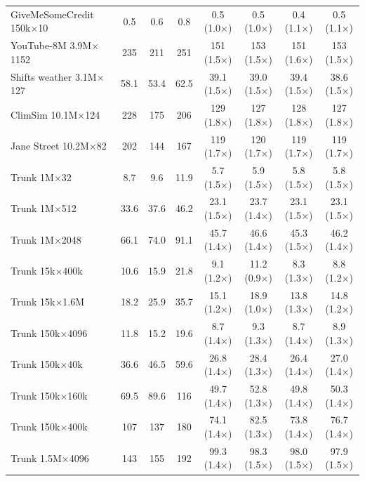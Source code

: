 \begin{table}[p]
\begin{tabular}{l|ccc|cccc}
        GiveMeSomeCredit 150k$\times$10 & 0.5 & 0.6 & 0.8 & 0.5 (1.0$\times$) & 0.5 (1.0$\times$) & 0.4 (1.1$\times$) & 0.5 (1.1$\times$) \\
        YouTube-8M 3.9M$\times$1152 & 235 & 211 & 251 & 151 (1.5$\times$) & 153 (1.5$\times$) & 151 (1.6$\times$) & 153 (1.5$\times$) \\
        Shifts weather 3.1M$\times$127 & 58.1 & 53.4 & 62.5 & 39.1 (1.5$\times$) & 39.0 (1.5$\times$) & 39.4 (1.5$\times$) & 38.6 (1.5$\times$) \\
        ClimSim 10.1M$\times$124 & 228 & 175 & 206 & 129 (1.8$\times$) & 127 (1.8$\times$) & 128 (1.8$\times$) & 127 (1.8$\times$) \\
        Jane Street 10.2M$\times$82 & 202 & 144 & 167 & 119 (1.7$\times$) & 120 (1.7$\times$) & 119 (1.7$\times$) & 119 (1.7$\times$) \\
        Trunk 1M$\times$32 & 8.7 & 9.6 & 11.9 & 5.7 (1.5$\times$) & 5.9 (1.5$\times$) & 5.8 (1.5$\times$) & 5.8 (1.5$\times$) \\
        Trunk 1M$\times$512 & 33.6 & 37.6 & 46.2 & 23.1 (1.5$\times$) & 23.7 (1.4$\times$) & 23.1 (1.5$\times$) & 23.1 (1.5$\times$) \\
        Trunk 1M$\times$2048 & 66.1 & 74.0 & 91.1 & 45.7 (1.4$\times$) & 46.6 (1.4$\times$) & 45.3 (1.5$\times$) & 46.2 (1.4$\times$) \\
        Trunk 15k$\times$400k & 10.6 & 15.9 & 21.8 & 9.1 (1.2$\times$) & 11.2 (0.9$\times$) & 8.3 (1.3$\times$) & 8.8 (1.2$\times$) \\
        Trunk 15k$\times$1.6M & 18.2 & 25.9 & 35.7 & 15.1 (1.2$\times$) & 18.9 (1.0$\times$) & 13.8 (1.3$\times$) & 14.8 (1.2$\times$) \\
        Trunk 150k$\times$4096 & 11.8 & 15.2 & 19.6 & 8.7 (1.4$\times$) & 9.3 (1.3$\times$) & 8.7 (1.4$\times$) & 8.9 (1.3$\times$) \\
        Trunk 150k$\times$40k & 36.6 & 46.5 & 59.6 & 26.8 (1.4$\times$) & 28.4 (1.3$\times$) & 26.4 (1.4$\times$) & 27.0 (1.4$\times$) \\
        Trunk 150k$\times$160k & 69.5 & 89.6 & 116 & 49.7 (1.4$\times$) & 52.8 (1.3$\times$) & 49.8 (1.4$\times$) & 50.3 (1.4$\times$) \\
        Trunk 150k$\times$400k & 107 & 137 & 180 & 74.1 (1.4$\times$) & 82.5 (1.3$\times$) & 73.8 (1.4$\times$) & 76.7 (1.4$\times$) \\
        Trunk 1.5M$\times$4096 & 143 & 155 & 192 & 99.3 (1.4$\times$) & 98.3 (1.5$\times$) & 98.0 (1.5$\times$) & 97.9 (1.5$\times$) \\

\end{tabular}
\end{table}
